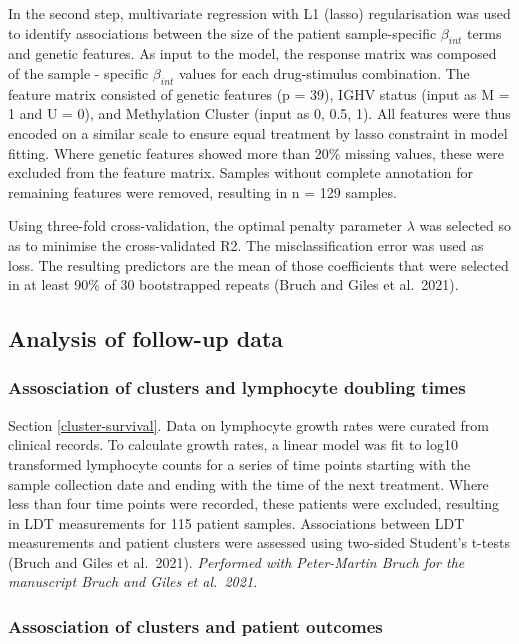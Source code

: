 \documentclass[11pt, a4paper, twosided]{book}
\begin{document}
In the second step, multivariate regression with L1 (lasso) regularisation was used to identify associations between the size of the patient sample-specific \(\beta_{int}\) terms and genetic features. As input to the model, the response matrix was composed of the sample - specific \(\beta_{int}\) values for each drug-stimulus combination. The feature matrix consisted of genetic features (p = 39), IGHV status (input as M = 1 and U = 0), and Methylation Cluster (input as 0, 0.5, 1). All features were thus encoded on a similar scale to ensure equal treatment by lasso constraint in model fitting. Where genetic features showed more than 20\% missing values, these were excluded from the feature matrix. Samples without complete annotation for remaining features were removed, resulting in n = 129 samples.

Using three-fold cross-validation, the optimal penalty parameter \(\lambda\) was selected so as to minimise the cross-validated R2. The misclassification error was used as loss. The resulting predictors are the mean of those coefficients that were selected in at least 90\% of 30 bootstrapped repeats (Bruch and Giles et al.~2021).

\hypertarget{analysis-of-follow-up-data}{%
\subsection{Analysis of follow-up data}\label{analysis-of-follow-up-data}}

\hypertarget{LDT-method}{%
\subsubsection{Assosciation of clusters and lymphocyte doubling times}\label{LDT-method}}

Section \ref{cluster-survival}. Data on lymphocyte growth rates were curated from clinical records. To calculate growth rates, a linear model was fit to log10 transformed lymphocyte counts for a series of time points starting with the sample collection date and ending with the time of the next treatment. Where less than four time points were recorded, these patients were excluded, resulting in LDT measurements for 115 patient samples. Associations between LDT measurements and patient clusters were assessed using two-sided Student's t-tests (Bruch and Giles et al.~2021). \emph{Performed with Peter-Martin Bruch for the manuscript Bruch and Giles et al.~2021.}

\hypertarget{survival-method}{%
\subsubsection{Assosciation of clusters and patient outcomes}\label{survival-method}}
\end{document}
